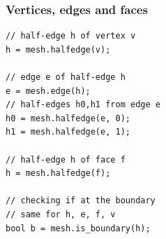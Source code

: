\begin{frame}[fragile]
\frametitle{Vertices, edges and faces}
\lstset{ numbers=none }
\begin{lstlisting}
// half-edge h of vertex v
h = mesh.halfedge(v);

// edge e of half-edge h
e = mesh.edge(h);
// half-edges h0,h1 from edge e
h0 = mesh.halfedge(e, 0);
h1 = mesh.halfedge(e, 1);

// half-edge h of face f
h = mesh.halfedge(f);

// checking if at the boundary
// same for h, e, f, v
bool b = mesh.is_boundary(h);
\end{lstlisting}
\end{frame}